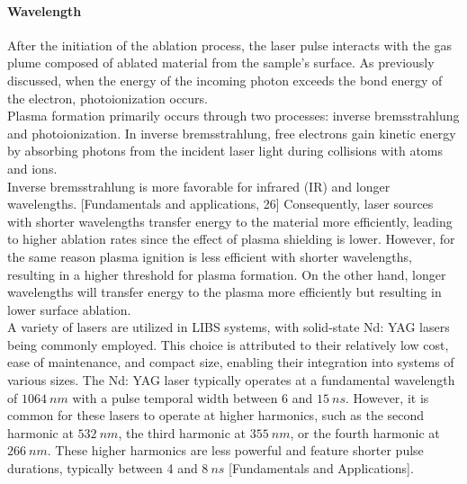 \paragraph{Wavelength}
\label{par:wavelength_setup_component}
After the initiation of the ablation process, the laser pulse interacts with the gas plume composed of ablated material from the sample's surface. As previously discussed, when the energy of the incoming photon exceeds the bond energy of the electron, photoionization occurs.
\\
Plasma formation primarily occurs through two processes: inverse bremsstrahlung and photoionization. In inverse bremsstrahlung, free electrons gain kinetic energy by absorbing photons from the incident laser light during collisions with atoms and ions.
\\
Inverse bremsstrahlung is more favorable for infrared (IR) and longer wavelengths. [Fundamentals and applications, 26] Consequently, laser sources with shorter wavelengths transfer energy to the material more efficiently, leading to higher ablation rates since the effect of plasma shielding is lower. However, for the same reason plasma ignition is less efficient with shorter wavelengths, resulting in a higher threshold for plasma formation. On the other hand, longer wavelengths will transfer energy to the plasma more efficiently but resulting in lower surface ablation.
\\
A variety of lasers are utilized in LIBS systems, with solid-state Nd: YAG lasers being commonly employed. This choice is attributed to their relatively low cost, ease of maintenance, and compact size, enabling their integration into systems of various sizes. The Nd: YAG laser typically operates at a fundamental wavelength of $1064\:nm$ with a pulse temporal width between $6$ and $15\:ns$. However, it is common for these lasers to operate at higher harmonics, such as the second harmonic at $532\:nm$, the third harmonic at $355\:nm$, or the fourth harmonic at $266\:nm$. These higher harmonics are less powerful and feature shorter pulse durations, typically between 4 and $8\:ns$ [Fundamentals and Applications].

